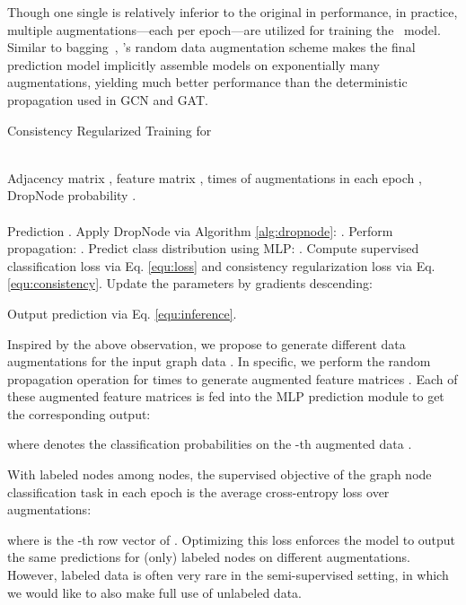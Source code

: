 {Though one single  is relatively inferior to the original  in performance, in practice, multiple augmentations---each per epoch---are utilized for training the \model\ model. 
Similar to bagging~\cite{breiman1996bagging}, \model's random data augmentation scheme makes the final prediction model implicitly assemble models on exponentially many augmentations, yielding much better performance than the deterministic propagation used in GCN and GAT.





 
 \begin{algorithm}[tb]
\caption{Consistency Regularized Training for \model}
\small
\label{alg:2}
\begin{algorithmic}[1] \REQUIRE ~~\\
 Adjacency matrix ,
feature matrix , 
times of augmentations in each epoch , DropNode probability .\\
\ENSURE ~~\\
Prediction . 
\FOR{} 
\STATE Apply DropNode via Algorithm \ref{alg:dropnode}: . 
\STATE Perform propagation: .
\STATE Predict class distribution using MLP: .
\ENDFOR
\STATE Compute supervised classification loss  via Eq. \ref{equ:loss} and consistency regularization loss via Eq. \ref{equ:consistency}.
\STATE Update the parameters  by gradients descending:

\ENDWHILE
\STATE Output prediction  via Eq. \ref{equ:inference}.
\end{algorithmic}
\end{algorithm}

 
 Inspired by the above observation, we propose to generate  different data augmentations for the input graph data . 
In specific, we perform the random propagation operation for  times to generate  augmented feature matrices . 
Each of these augmented feature matrices is fed into the MLP prediction module to get the corresponding output:


where  denotes the classification probabilities on the -th augmented data . 


With  labeled nodes among  nodes, the supervised objective of the graph node classification task in each epoch is the average cross-entropy loss over  augmentations:


\noindent where  is the -th row vector of  . Optimizing this loss enforces the model to output the same predictions for (only) labeled nodes on different augmentations.
However, labeled data is often very rare in the semi-supervised setting, in which we would like to also make full use of unlabeled data. 





}
